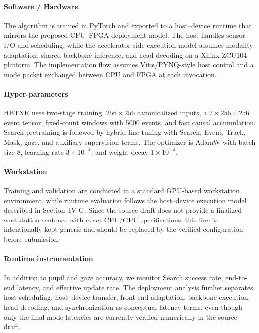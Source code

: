 \documentclass[journal]{IEEEtran}
\begin{document}
\paragraph*{Software / Hardware}
The algorithm is trained in PyTorch and exported to a host--device runtime that mirrors the proposed CPU--FPGA deployment model. The host handles sensor I/O and scheduling, while the accelerator-side execution model assumes modality adaptation, shared-backbone inference, and head decoding on a Xilinx ZCU104 platform. The implementation flow assumes Vitis/PYNQ-style host control and a mode packet exchanged between CPU and FPGA at each invocation.

\paragraph*{Hyper-parameters}
HBTXR uses two-stage training, $256\times256$ canonicalized inputs, a $2\times256\times256$ event tensor, fixed-count windows with 5000 events, and fast causal accumulation. Search pretraining is followed by hybrid fine-tuning with Search, Event, Track, Mask, gaze, and auxiliary supervision terms. The optimizer is AdamW with batch size 8, learning rate $3\times10^{-4}$, and weight decay $1\times10^{-4}$.

\paragraph*{Workstation}
Training and validation are conducted in a standard GPU-based workstation environment, while runtime evaluation follows the host--device execution model described in Section~IV-G. Since the source draft does not provide a finalized workstation sentence with exact CPU/GPU specifications, this line is intentionally kept generic and should be replaced by the verified configuration before submission.

\paragraph*{Runtime instrumentation}
In addition to pupil and gaze accuracy, we monitor Search success rate, end-to-end latency, and effective update rate. The deployment analysis further separates host scheduling, host--device transfer, front-end adaptation, backbone execution, head decoding, and synchronization as conceptual latency terms, even though only the final mode latencies are currently verified numerically in the source draft.
\end{document}
